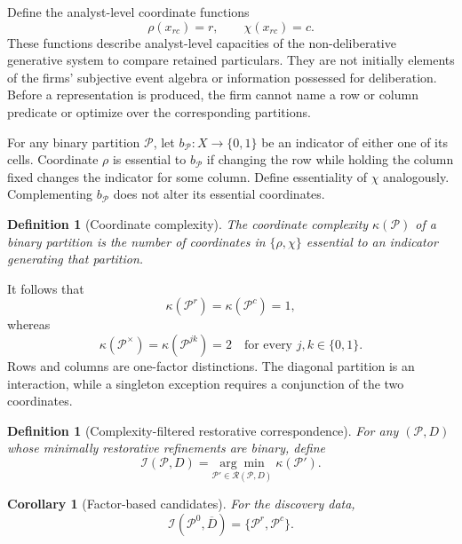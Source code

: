 \documentclass[11pt]{article}
\newtheorem{definition}[assumption]{Definition}
\newtheorem{corollary}[assumption]{Corollary}
\newcommand{\Prow}{\mathcal P^{r}}
\newcommand{\Pcol}{\mathcal P^{c}}
\newcommand{\Pdiag}{\mathcal P^{\times}}
\begin{document}
Define the analyst-level coordinate functions
\[
\rho(x_{rc})=r,
\qquad
\chi(x_{rc})=c.
\]
These functions describe analyst-level capacities of the non-deliberative
generative system to compare retained particulars.  They are not initially
elements of the firms' subjective event algebra or information possessed for
deliberation.  Before a representation is produced, the firm cannot name a row
or column predicate or optimize over the corresponding partitions.

For any binary partition $\mathcal P$, let $b_{\mathcal P}:X\to\{0,1\}$ be an
indicator of either one of its cells.  Coordinate $\rho$ is essential to
$b_{\mathcal P}$ if changing the row while holding the column fixed changes the
indicator for some column.  Define essentiality of $\chi$ analogously.
Complementing $b_{\mathcal P}$ does not alter its essential coordinates.

\begin{definition}[Coordinate complexity]
The coordinate complexity $\kappa(\mathcal P)$ of a binary partition is the
number of coordinates in $\{\rho,\chi\}$ essential to an indicator generating
that partition.
\end{definition}

It follows that
\begin{equation}
\kappa(\Prow)=\kappa(\Pcol)=1,
\label{eq:factor-complexity}
\end{equation}
whereas
\begin{equation}
\kappa(\Pdiag)=\kappa(\mathcal P^{jk})=2
\quad\text{for every }j,k\in\{0,1\}.
\label{eq:interaction-complexity}
\end{equation}
Rows and columns are one-factor distinctions.  The diagonal partition is an
interaction, while a singleton exception requires a conjunction of the two
coordinates.

\begin{definition}[Complexity-filtered restorative correspondence]
For any $(\mathcal P,D)$ whose minimally restorative refinements are binary,
define
\begin{equation}
\mathcal I(\mathcal P,D)
=
\underset{\mathcal P'\in\mathcal R(\mathcal P,D)}{\arg\min}
\;\kappa(\mathcal P').
\label{eq:inquiry-correspondence}
\end{equation}
\end{definition}

\begin{corollary}[Factor-based candidates]
\label{cor:factor-candidates}
For the discovery data,
\[
\mathcal I(\mathcal P^0,\overline D)=\{\Prow,\Pcol\}.
\]
\end{corollary}
\end{document}
